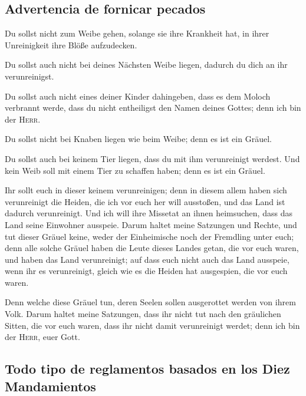 \hypertarget{advertencia-de-fornicar-pecados}{%
\subsection{Advertencia de fornicar
pecados}\label{advertencia-de-fornicar-pecados}}

 Du sollst nicht zum Weibe gehen, solange sie ihre
Krankheit hat, in ihrer Unreinigkeit ihre Blöße aufzudecken.

 Du sollst auch nicht bei deines Nächsten Weibe liegen,
dadurch du dich an ihr verunreinigst.

 Du sollst auch nicht eines deiner Kinder dahingeben,
dass es dem Moloch verbrannt werde, dass du nicht entheiligst den Namen
deines Gottes; denn ich bin der \textsc{Herr}.

 Du sollst nicht bei Knaben liegen wie beim Weibe; denn
es ist ein Gräuel.

 Du sollst auch bei keinem Tier liegen, dass du mit ihm
verunreinigt werdest. Und kein Weib soll mit einem Tier zu schaffen
haben; denn es ist ein Gräuel.

 Ihr sollt euch in dieser keinem verunreinigen; denn in
diesem allem haben sich verunreinigt die Heiden, die ich vor euch her
will ausstoßen,  und das Land ist dadurch verunreinigt.
Und ich will ihre Missetat an ihnen heimsuchen, dass das Land seine
Einwohner ausspeie.  Darum haltet meine Satzungen und
Rechte, und tut dieser Gräuel keine, weder der Einheimische noch der
Fremdling unter euch;  denn alle solche Gräuel haben die
Leute dieses Landes getan, die vor euch waren, und haben das Land
verunreinigt;  auf dass euch nicht auch das Land
ausspeie, wenn ihr es verunreinigt, gleich wie es die Heiden hat
ausgespien, die vor euch waren.

 Denn welche diese Gräuel tun, deren Seelen sollen
ausgerottet werden von ihrem Volk.  Darum haltet meine
Satzungen, dass ihr nicht tut nach den gräulichen Sitten, die vor euch
waren, dass ihr nicht damit verunreinigt werdet; denn ich bin der
\textsc{Herr}, euer Gott.

\hypertarget{todo-tipo-de-reglamentos-basados-en-los-diez-mandamientos}{%
\subsection{Todo tipo de reglamentos basados \hspace{0pt}\hspace{0pt}en
los Diez
Mandamientos}\label{todo-tipo-de-reglamentos-basados-en-los-diez-mandamientos}}

